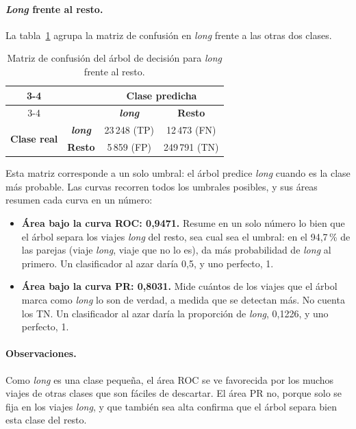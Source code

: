 \documentclass[12pt,a4paper]{article}
\begin{document}
\paragraph{\textit{Long} frente al resto.} La tabla~\ref{tab:cm-dt-long}
agrupa la matriz de confusión en \textit{long} frente a las otras dos
clases.
 
\begin{table}[H]
\centering
\renewcommand{\arraystretch}{1.2}
\begin{tabular}{cc|c|c|}
\cline{3-4}
& & \multicolumn{2}{c|}{\textbf{Clase predicha}} \\
\cline{3-4}
& & \textit{\textbf{long}} & \textbf{Resto} \\
\hline
\multicolumn{1}{|c|}{\multirow{2}{*}{\textbf{Clase real}}} & \textit{\textbf{long}} & \cellcolor{green!25}23\,248 (\acs{TP}) & \cellcolor{red!25}12\,473 (\acs{FN}) \\
\cline{2-4}
\multicolumn{1}{|c|}{} & \textbf{Resto} & \cellcolor{red!25}5\,859 (\acs{FP}) & \cellcolor{green!25}249\,791 (\acs{TN}) \\
\hline
\end{tabular}
\caption{Matriz de confusión del árbol de decisión para \textit{long}
frente al resto.}
\label{tab:cm-dt-long}
\end{table}
 
Esta matriz corresponde a un solo umbral: el árbol predice \textit{long}
cuando es la clase más probable. Las curvas recorren todos los umbrales
posibles, y sus áreas resumen cada curva en un número:
\begin{itemize}
    \item \textbf{Área bajo la curva \acs{ROC}: 0,9471.} Resume en un solo
    número lo bien que el árbol separa los viajes \textit{long} del resto,
    sea cual sea el umbral: en el 94,7\,\% de las parejas (viaje
    \textit{long}, viaje que no lo es), da más probabilidad de \textit{long}
    al primero. Un clasificador al azar daría 0,5, y uno perfecto, 1.
    \item \textbf{Área bajo la curva \acs{PR}: 0,8031.} Mide cuántos de los
    viajes que el árbol marca como \textit{long} lo son de verdad, a medida
    que se detectan más. No cuenta los \acs{TN}. Un clasificador al azar
    daría la proporción de \textit{long}, 0,1226, y uno perfecto, 1.
\end{itemize}
\paragraph{Observaciones.} Como \textit{long} es una clase pequeña, el
área \acs{ROC} se ve favorecida por los muchos viajes de otras clases que
son fáciles de descartar. El área \acs{PR} no, porque solo se fija en los
viajes \textit{long}, y que también sea alta confirma que el árbol
separa bien esta clase del resto.
\end{document}
